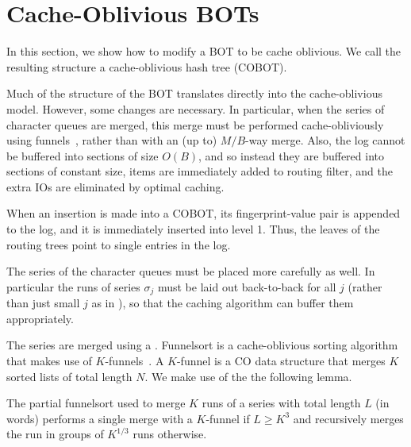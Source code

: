\section{Cache-Oblivious BOTs}\label{sec:boa-cacheoblivious}

In this section, we show how to modify a BOT to be cache oblivious.  We call
the resulting structure a cache-oblivious hash tree (COBOT). 

Much of the structure of the BOT translates directly into the cache-oblivious
model. However, some changes are necessary. In particular, when the series of
character queues are merged, this merge must be performed cache-obliviously
using funnels~\cite{DBLP:conf/focs/FrigoLPR99}, rather than with an (up to)
$M/B$-way merge. Also, the log cannot be buffered into sections of size $O(B)$,
and so instead they are buffered into sections of constant size, items are
immediately added to routing filter, and the extra IOs are eliminated by
optimal caching.

When an insertion is made into a COBOT, its fingerprint-value pair is
appended to the log, and it is immediately inserted into level 1. Thus, the
leaves of the routing trees point to single entries in the log.

The series of the character queues must be placed more carefully as well. In
particular the runs of series $\sigma_j$ must be laid out back-to-back for all
$j$ (rather than just small $j$ as in ), so that the
caching algorithm can buffer them appropriately.

The series are merged using a . Funnelsort is a
cache-oblivious sorting algorithm that makes use of
$K$-funnels~\cite{DBLP:conf/focs/FrigoLPR99}. A $K$-funnel is a CO data structure
that merges $K$ sorted lists of total length $N$. We make use of the the
following lemma.

	
The partial funnelsort used to merge $K$ runs of a series with total length $L$
(in words) performs a single merge with a $K$-funnel if $L \geq K^3$ and
recursively merges the run in groups of $K^{1/3}$ runs otherwise.

